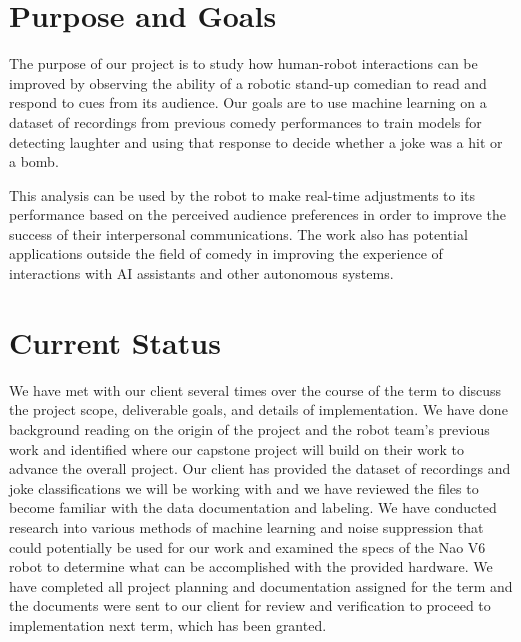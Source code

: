 \documentclass[onecolumn, draftclsnofoot,10pt, compsoc]{IEEEtran}
\begin{document}
\section{Purpose and Goals}
The purpose of our project is to study how human-robot interactions can be improved by observing the ability of a robotic stand-up comedian to read and respond to cues from its audience. Our goals are to use machine learning on a dataset of recordings from previous comedy performances to train models for detecting laughter and using that response to decide whether a joke was a hit or a bomb.\par
\vspace{.3cm}
\noindent This analysis can be used by the robot to make real-time adjustments to its performance based on the perceived audience preferences in order to improve the success of their interpersonal communications. The work also has potential applications outside the field of comedy in improving the experience of interactions with AI assistants and other autonomous systems.

\section{Current Status}
We have met with our client several times over the course of the term to discuss the project scope, deliverable goals, and details of implementation. We have done background reading on the origin of the project and the robot team's previous work and identified where our capstone project will build on their work to advance the overall project. Our client has provided the dataset of recordings and joke classifications we will be working with and we have reviewed the files to become familiar with the data documentation and labeling. We have conducted research into various methods of machine learning and noise suppression that could potentially be used for our work and examined the specs of the Nao V6 robot to determine what can be accomplished with the provided hardware. We have completed all project planning and documentation assigned for the term and the documents were sent to our client for review and verification to proceed to implementation next term, which has been granted.
\end{document}
